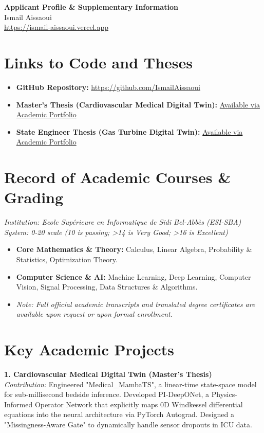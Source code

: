 \documentclass[11pt, a4paper]{article}
\begin{document}
\begin{center}
    {\LARGE \textbf{Applicant Profile \& Supplementary Information}} \\
    \vspace{0.2cm}
    Ismail Aissaoui \\
    \href{https://ismail-aissaoui.vercel.app}{https://ismail-aissaoui.vercel.app}
\end{center}

\section*{Links to Code and Theses}
\begin{itemize}
    \item \textbf{GitHub Repository:} \href{https://github.com/IsmailAissaoui}{https://github.com/IsmailAissaoui}
    \item \textbf{Master's Thesis (Cardiovascular Medical Digital Twin):} \href{https://ismail-aissaoui.vercel.app}{Available via Academic Portfolio}
    \item \textbf{State Engineer Thesis (Gas Turbine Digital Twin):} \href{https://ismail-aissaoui.vercel.app}{Available via Academic Portfolio}
\end{itemize}

\section*{Record of Academic Courses \& Grading}
\textit{Institution: Ecole Supérieure en Informatique de Sidi Bel-Abbès (ESI-SBA)} \\
\textit{System: 0-20 scale (10 is passing; \textgreater 14 is Very Good; \textgreater 16 is Excellent)}
\begin{itemize}
    \item \textbf{Core Mathematics \& Theory:} Calculus, Linear Algebra, Probability \& Statistics, Optimization Theory.
    \item \textbf{Computer Science \& AI:} Machine Learning, Deep Learning, Computer Vision, Signal Processing, Data Structures \& Algorithms.
    \item \textit{Note: Full official academic transcripts and translated degree certificates are available upon request or upon formal enrollment.}
\end{itemize}

\section*{Key Academic Projects}
\textbf{1. Cardiovascular Medical Digital Twin (Master's Thesis)} \\
\textit{Contribution:} Engineered "Medical\_MambaTS", a linear-time state-space model for sub-millisecond bedside inference. Developed PI-DeepONet, a Physics-Informed Operator Network that explicitly maps 0D Windkessel differential equations into the neural architecture via PyTorch Autograd. Designed a "Missingness-Aware Gate" to dynamically handle sensor dropouts in ICU data.
\end{document}
